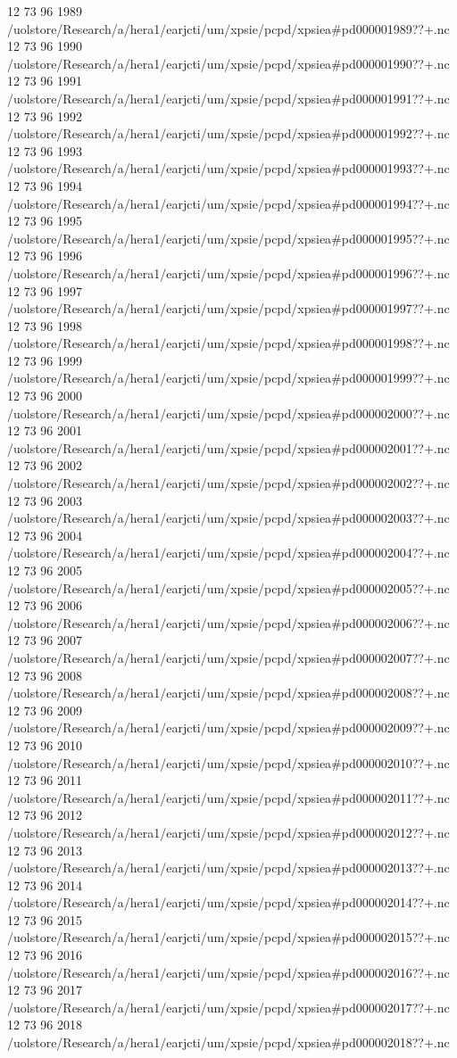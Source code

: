 12 73 96
1989
/uolstore/Research/a/hera1/earjcti/um/xpsie/pcpd/xpsiea#pd000001989??+.nc
12 73 96
1990
/uolstore/Research/a/hera1/earjcti/um/xpsie/pcpd/xpsiea#pd000001990??+.nc
12 73 96
1991
/uolstore/Research/a/hera1/earjcti/um/xpsie/pcpd/xpsiea#pd000001991??+.nc
12 73 96
1992
/uolstore/Research/a/hera1/earjcti/um/xpsie/pcpd/xpsiea#pd000001992??+.nc
12 73 96
1993
/uolstore/Research/a/hera1/earjcti/um/xpsie/pcpd/xpsiea#pd000001993??+.nc
12 73 96
1994
/uolstore/Research/a/hera1/earjcti/um/xpsie/pcpd/xpsiea#pd000001994??+.nc
12 73 96
1995
/uolstore/Research/a/hera1/earjcti/um/xpsie/pcpd/xpsiea#pd000001995??+.nc
12 73 96
1996
/uolstore/Research/a/hera1/earjcti/um/xpsie/pcpd/xpsiea#pd000001996??+.nc
12 73 96
1997
/uolstore/Research/a/hera1/earjcti/um/xpsie/pcpd/xpsiea#pd000001997??+.nc
12 73 96
1998
/uolstore/Research/a/hera1/earjcti/um/xpsie/pcpd/xpsiea#pd000001998??+.nc
12 73 96
1999
/uolstore/Research/a/hera1/earjcti/um/xpsie/pcpd/xpsiea#pd000001999??+.nc
12 73 96
2000
/uolstore/Research/a/hera1/earjcti/um/xpsie/pcpd/xpsiea#pd000002000??+.nc
12 73 96
2001
/uolstore/Research/a/hera1/earjcti/um/xpsie/pcpd/xpsiea#pd000002001??+.nc
12 73 96
2002
/uolstore/Research/a/hera1/earjcti/um/xpsie/pcpd/xpsiea#pd000002002??+.nc
12 73 96
2003
/uolstore/Research/a/hera1/earjcti/um/xpsie/pcpd/xpsiea#pd000002003??+.nc
12 73 96
2004
/uolstore/Research/a/hera1/earjcti/um/xpsie/pcpd/xpsiea#pd000002004??+.nc
12 73 96
2005
/uolstore/Research/a/hera1/earjcti/um/xpsie/pcpd/xpsiea#pd000002005??+.nc
12 73 96
2006
/uolstore/Research/a/hera1/earjcti/um/xpsie/pcpd/xpsiea#pd000002006??+.nc
12 73 96
2007
/uolstore/Research/a/hera1/earjcti/um/xpsie/pcpd/xpsiea#pd000002007??+.nc
12 73 96
2008
/uolstore/Research/a/hera1/earjcti/um/xpsie/pcpd/xpsiea#pd000002008??+.nc
12 73 96
2009
/uolstore/Research/a/hera1/earjcti/um/xpsie/pcpd/xpsiea#pd000002009??+.nc
12 73 96
2010
/uolstore/Research/a/hera1/earjcti/um/xpsie/pcpd/xpsiea#pd000002010??+.nc
12 73 96
2011
/uolstore/Research/a/hera1/earjcti/um/xpsie/pcpd/xpsiea#pd000002011??+.nc
12 73 96
2012
/uolstore/Research/a/hera1/earjcti/um/xpsie/pcpd/xpsiea#pd000002012??+.nc
12 73 96
2013
/uolstore/Research/a/hera1/earjcti/um/xpsie/pcpd/xpsiea#pd000002013??+.nc
12 73 96
2014
/uolstore/Research/a/hera1/earjcti/um/xpsie/pcpd/xpsiea#pd000002014??+.nc
12 73 96
2015
/uolstore/Research/a/hera1/earjcti/um/xpsie/pcpd/xpsiea#pd000002015??+.nc
12 73 96
2016
/uolstore/Research/a/hera1/earjcti/um/xpsie/pcpd/xpsiea#pd000002016??+.nc
12 73 96
2017
/uolstore/Research/a/hera1/earjcti/um/xpsie/pcpd/xpsiea#pd000002017??+.nc
12 73 96
2018
/uolstore/Research/a/hera1/earjcti/um/xpsie/pcpd/xpsiea#pd000002018??+.nc
